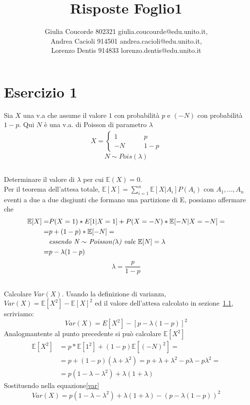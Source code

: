 \documentclass[a4paper]{article}
\newcommand{\E}[0]{\mathbb{E}}
\begin{document}
\author{Giulia Coucorde 802321 giulia.coucourde@edu.unito.it,\\ Andrea Cacioli 914501 andrea.cacioli@edu.unito.it,\\ Lorenzo Dentis 914833 lorenzo.dentis@edu.unito.it}
\title{Risposte Foglio1}
\maketitle
\section{Esercizio 1}
Sia $X$ una v.a che assume il valore $1$ con probabilità $p$ e $(-N)$ con probabilità $1 - p$. Qui $N$ è una v.a. di Poisson di parametro $\lambda$
\begin{align}
	X=
	\begin{cases}
		1 \qquad & p\\
		-N \qquad & 1-p
	\end{cases}
\end{align}
$$N \sim Pois(\lambda)$$ 
\subsection{}
\label{SEC:1.a}
Determinare il valore di $\lambda$ per cui $\E(X) = 0$.\\
Per il teorema dell'attesa totale, $\E[X] = \sum_{i=1}^n\E[X|A_i]P(A_i)$ con $A_1, ..., A_n$ eventi a due a due disgiunti che formano una partizione di E, possiamo affermare che
\begin{align*}
	\E[X] = & P(X=1) * E[1 | X=1] + P(X=-N)*\E[-N | X= -N]=\\
	= & p + (1-p) * \E[-N]=\\
	  & \text{\textit{essendo N $\sim$ Poisson($\lambda$) vale $\E[N] = \lambda$}}\\
	= & p - \lambda(1-p) 
\end{align*}
$$\lambda = \frac{p}{1-p}$$
\subsection{}
Calcolare $Var(X)$.
Usando la definizione di varianza, $Var(X) = \E[X^2] - \E[X]^2$  ed il valore dell'attesa calcolato in sezione~\ref{SEC:1.a}, scriviamo:
\begin{equation}\label{var}Var(X) =  E[X^2] - [p - \lambda(1-p)]^2\end{equation} 
Analogmantente al punto precedente si può calcolare $\E[X^2]$
\begin{align*}
	\E[X^2] &= p* \E[1^2] + (1-p)\E[(-N)^2]=\\
		&= p + (1-p)(\lambda + \lambda^2)= p+\lambda +\lambda^2 -p\lambda - p\lambda^2 =\\
		&= p(1-\lambda -\lambda^2) + \lambda(1+\lambda) 
\end{align*}
Sostituendo nella equazione\eqref{var}
$$Var(X) =  p(1-\lambda -\lambda^2) + \lambda(1+\lambda) - (p - \lambda(1-p))^2 $$
\end{document}
